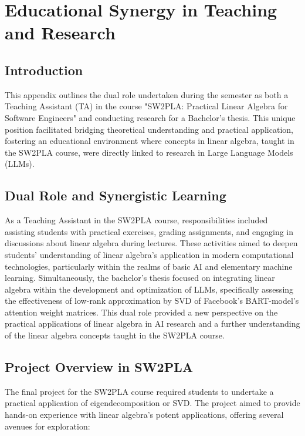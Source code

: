 \chapter{Educational Synergy in Teaching and Research}\label{appendix:Education}
\section*{Introduction}

This appendix outlines the dual role undertaken during the semester as both a Teaching Assistant (TA) in the course "SW2PLA: Practical Linear Algebra for Software Engineers" and conducting research for a Bachelor's thesis. This unique position facilitated bridging theoretical understanding and practical application, fostering an educational environment where concepts in linear algebra, taught in the SW2PLA course, were directly linked to research in Large Language Models (LLMs).

\section*{Dual Role and Synergistic Learning}

As a Teaching Assistant in the SW2PLA course, responsibilities included assisting students with practical exercises, grading assignments, and engaging in discussions about linear algebra during lectures. These activities aimed to deepen students' understanding of linear algebra's application in modern computational technologies, particularly within the realms of basic AI and elementary machine learning. Simultaneously, the bachelor's thesis focused on integrating linear algebra within the development and optimization of LLMs, specifically assessing the effectiveness of low-rank approximation by SVD of Facebook's BART-model's attention weight matrices. This dual role provided a new perspective on the practical applications of linear algebra in AI research and a further understanding of the linear algebra concepts taught in the SW2PLA course.

\section*{Project Overview in SW2PLA}

The final project for the SW2PLA course required students to undertake a practical application of eigendecomposition or SVD. The project aimed to provide hands-on experience with linear algebra's potent applications, offering several avenues for exploration:

